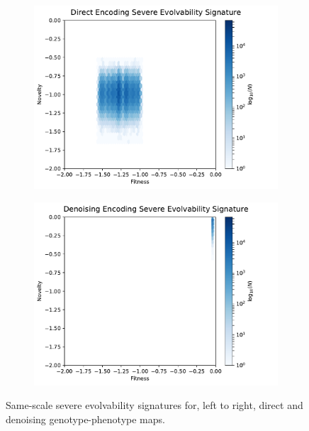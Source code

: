 \begin{figure}
        \begin{subfigure}[b]{0.5\textwidth}
                \includegraphics[width=\linewidth]{img/direct_severe_es_scaled2}
        \end{subfigure}%
        \begin{subfigure}[b]{0.5\textwidth}
                \includegraphics[width=\linewidth]{img/noise_severe_es_scaled2}
        \end{subfigure}
        \caption{Same-scale severe evolvability signatures for, left to right, direct and denoising genotype-phenotype maps.}
        \label{fig:noise_severe_compare_es}
\end{figure}
